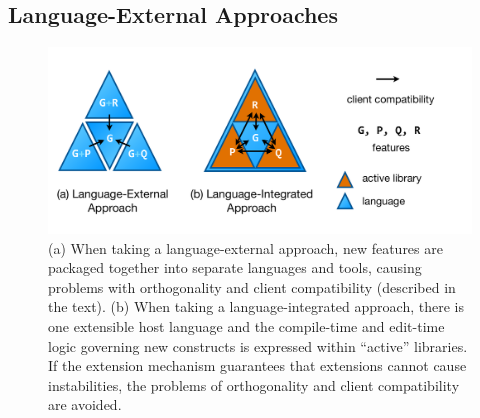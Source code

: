 \subsection{Language-External Approaches}\label{external-approaches}
\begin{figure}
\begin{center}
\includegraphics[scale=.48]{approaches.pdf}
\end{center}
\vspace{-20px}
\caption{\small (a) When taking a language-external approach, new features are packaged together into separate languages and tools, causing problems with orthogonality and client compatibility (described in the text). (b) When taking a language-integrated approach, there is one extensible host language and the compile-time and edit-time logic governing new constructs is expressed within ``active'' libraries. If the extension mechanism guarantees that extensions cannot cause instabilities, the problems of orthogonality and client compatibility are avoided.}
\label{approaches}
\end{figure}

